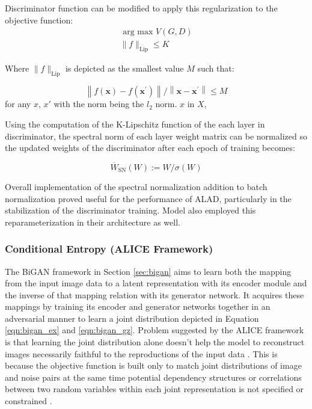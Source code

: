 {Discriminator function can be modified to apply this regularization to the objective function: 
\begin{equation}
\begin{array}{l}{\text { arg max } V(G, D)} \\ {\|f\|_{\mathrm{Lip}} \leq K}\end{array} 
\end{equation}

Where $\|f\|_{\mathrm{Lip}}$ is depicted as the smallest value $M$ such that: 

\begin{equation}
    \left\|f(\boldsymbol{x})-f\left(\boldsymbol{x}^{\prime}\right)\right\| /\left\|\boldsymbol{x}-\boldsymbol{x}^{\prime}\right\| \leq M 
\end{equation}
for any $x$, $x'$ with the norm being the $l_2$ norm. $x$ in $X$,\cite{sohrab2011basic}

Using the computation of the K-Lipschitz function of the each layer in discriminator, the spectral
norm of each layer weight matrix can be normalized so the updated weights of the discriminator after
each epoch of training becomes:

\begin{equation}
    \overline{W}_{\mathrm{SN}}(W) :=W / \sigma(W) 
\end{equation}

Overall implementation of the spectral normalization addition to batch normalization proved useful for the performance of 
ALAD, particularly in the stabilization of the discriminator training. Model also employed this reparameterization in their 
architecture as well. 

\subsubsection{Conditional Entropy (ALICE Framework)}
\label{sec:alad_alice}

The BiGAN framework in Section \ref{sec:bigan} aims to learn both the mapping from the input image
data to a latent representation with its encoder module and the inverse of that mapping relation
with its generator network. It acquires these mappings by training its encoder and generator networks
together in an adversarial manner to learn a joint distribution depicted in Equation
\ref{eqn:bigan_ex} and \ref{eqn:bigan_gz}. Problem suggested by the ALICE
framework\cite{Li2017TowardsUA} is that learning the joint distribution alone doesn't help the model
to reconstruct images necessarily faithful to the reproductions of the input data
\cite{Li2017TowardsUA}. This is because the objective function is built only to match joint
distributions of image and noise pairs at the same time potential dependency structures or
correlations between two random variables within each joint representation is not specified or
constrained \cite{Li2017TowardsUA}.

}
